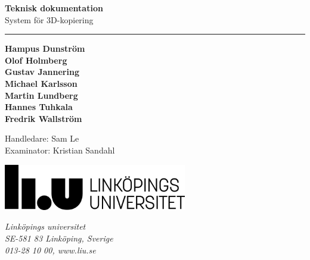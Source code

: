 \documentclass[a4paper,titlepage,12pt]{article}
\begin{document}
\begin{titlepage}

\vspace*{\fill}
\huge
\textbf{Teknisk dokumentation} \\
\Large
System för 3D-kopiering \\
\noindent\rule{17cm}{0.4pt}
\bigskip

\small
\textbf{Hampus Dunström \\
Olof Holmberg \\
Gustav Jannering \\
Michael Karlsson \\
Martin Lundberg \\
Hannes Tuhkala \\
Fredrik Wallström}
\bigskip
\bigskip

Handledare: Sam Le \\
Examinator: Kristian Sandahl

\date{\today}
\vspace*{\fill}

\vspace*{\fill}
\begin{minipage}[b]{0.7\textwidth}
	\includegraphics[width=8cm]{images/liu-logga.png}
\end{minipage}
\begin{minipage}[b]{0.4\textwidth}
	\normalsize
	\textit{Linköpings universitet} \\
	\textit{SE-581 83 Linköping, Sverige}\\
	\textit{013-28 10 00, www.liu.se}
\end{minipage}

\end{titlepage}
\newpage
\end{document}
